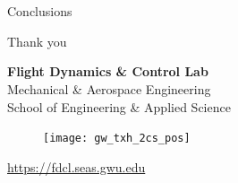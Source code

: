 \documentclass[11pt,professionalfonts]{beamer}
\begin{document}
\section*{}
\subsection*{}

\begin{frame}{Conclusions} %

	

\end{frame}   %

\begin{frame}[c]{Thank you}
	\centering
	
	\textbf{\large Flight Dynamics \& Control Lab} \\
	Mechanical \& Aerospace Engineering \\
	School of Engineering \& Applied Science
	
	\begin{figure} %
       	\texttt{[image: gw\_txh\_2cs\_pos]}
  	\end{figure}
	
	\url{https://fdcl.seas.gwu.edu}
\end{frame}
\end{document}

